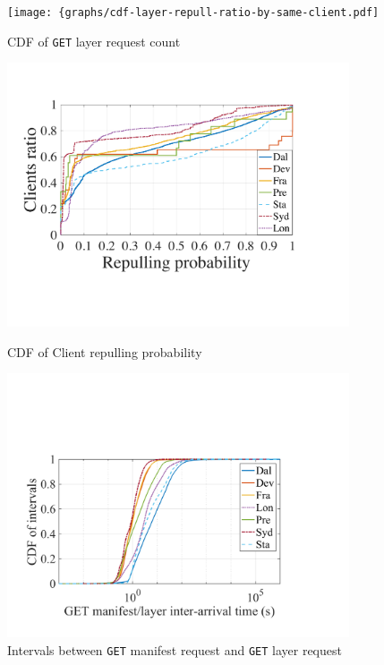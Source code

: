 \begin{figure}[t]
        \centering
        \begin{minipage}{0.3\textwidth}
                \centering
                \texttt{[image: \{graphs/cdf-layer-repull-ratio-by-same-client.pdf]}
                \caption{CDF of \texttt{GET} layer request count}
                \label{fig:layer-repull-cdf}
        \end{minipage}%
        \begin{minipage}{0.3\textwidth}
                \centering
                \includegraphics[width=0.9\textwidth]{graphs/cdf-client-repull-layer-request-ratio.pdf}
                \caption{CDF of Client repulling probability}%
                \label{fig:client-repull-cdf}
        \end{minipage}%
        \begin{minipage}{0.3\textwidth}
        \centering
        \includegraphics[width=0.9\textwidth]{graphs/GML-intervals.pdf}
        \caption{Intervals between \texttt{GET} manifest request and \texttt{GET} layer request}
        \label{fig:intervals}
   \end{minipage}
\end{figure}





